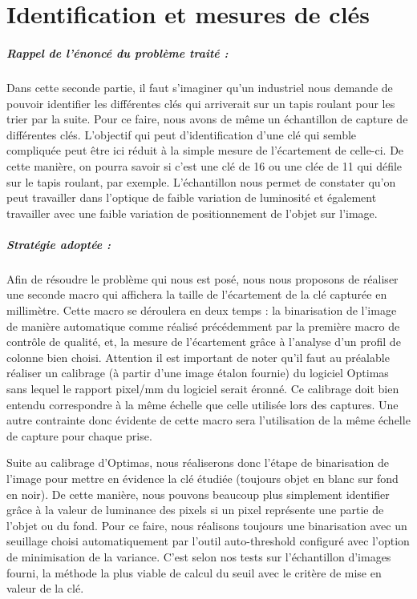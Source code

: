 \documentclass{scrreprt}
\begin{document}
\chapter{Identification et mesures de clés}

\paragraph{Rappel de l'énoncé du problème traité :}
Dans cette seconde partie, il faut s'imaginer qu'un industriel nous demande de pouvoir identifier les différentes clés qui
arriverait sur un tapis roulant pour les trier par la suite. Pour ce faire, nous avons de même un échantillon de capture
de différentes clés. L'objectif qui peut d'identification d'une clé qui semble compliquée peut être ici réduit à la simple
mesure de l'écartement de celle-ci. De cette manière, on pourra savoir si c'est une clé de 16 ou une clée de 11 qui défile 
sur le tapis roulant, par exemple. L'échantillon nous permet de constater qu'on peut travailler dans l'optique de faible
variation de luminosité et également travailler avec une faible variation de positionnement de l'objet sur l'image.
 
\paragraph{Stratégie adoptée :}
Afin de résoudre le problème qui nous est posé, nous nous proposons de réaliser une seconde macro qui affichera
la taille de l'écartement de la clé capturée en millimètre. Cette macro se déroulera en deux temps : la binarisation 
de l'image de manière automatique comme réalisé précédemment par la première macro de contrôle de qualité, et, la mesure
de l'écartement grâce à l'analyse d'un profil de colonne bien choisi. Attention il est important de noter qu'il faut au 
préalable réaliser un calibrage (à partir d'une image étalon fournie)  du logiciel Optimas sans lequel le rapport pixel/mm
du logiciel serait éronné. Ce calibrage doit bien entendu correspondre à la même échelle que celle utilisée lors des captures.
Une autre contrainte donc évidente de cette macro sera l'utilisation de la même échelle de capture pour chaque prise. 

Suite au calibrage d'Optimas, nous réaliserons donc l'étape de binarisation de l'image pour mettre en évidence la clé étudiée (toujours
objet en blanc sur fond en noir). De cette manière, nous pouvons beaucoup plus simplement identifier grâce à la valeur de luminance 
des pixels si un pixel représente une partie de l'objet ou du fond. Pour ce faire, nous réalisons toujours une binarisation avec un 
seuillage choisi automatiquement par l'outil auto-threshold configuré avec l'option de minimisation de la variance. C'est selon nos 
tests sur l'échantillon d'images fourni, la méthode la plus viable de calcul du seuil avec le critère de mise en valeur de la clé. 
\end{document}
